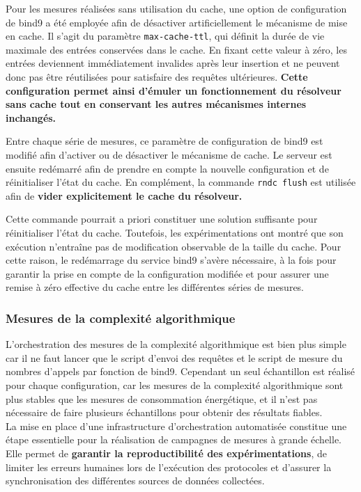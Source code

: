 \documentclass[12pt, a4paper]{report}
\begin{document}
	Pour les mesures réalisées sans utilisation du cache, une option de configuration de \gls{bind9} a été employée afin de désactiver artificiellement le mécanisme de mise en cache. Il s'agit du paramètre \texttt{max-cache-ttl}, qui définit la durée de vie maximale des entrées conservées dans le cache. En fixant cette valeur à zéro, les entrées deviennent immédiatement invalides après leur insertion et ne peuvent donc pas être réutilisées pour satisfaire des requêtes ultérieures. \textbf{Cette configuration permet ainsi d'émuler un fonctionnement du résolveur sans cache tout en conservant les autres mécanismes internes inchangés.}

	Entre chaque série de mesures, ce paramètre de configuration de \gls{bind9} est modifié afin d'activer ou de désactiver le mécanisme de cache. Le serveur est ensuite redémarré afin de prendre en compte la nouvelle configuration et de réinitialiser l'état du cache. En complément, la commande \texttt{rndc flush} est utilisée afin de \textbf{vider explicitement le cache du résolveur.}

	Cette commande pourrait a priori constituer une solution suffisante pour réinitialiser l'état du cache. Toutefois, les expérimentations ont montré que son exécution n'entraîne pas de modification observable de la taille du cache. Pour cette raison, le redémarrage du service \gls{bind9} s'avère nécessaire, à la fois pour garantir la prise en compte de la configuration modifiée et pour assurer une remise à zéro effective du cache entre les différentes séries de mesures.

	\subsubsection{Mesures de la complexité algorithmique}
		
	L'orchestration des mesures de la complexité algorithmique est bien plus simple car il ne faut lancer que le script d'envoi des requêtes et le script de mesure du nombres d'appels par fonction de \gls{bind9}. Cependant un seul échantillon est réalisé pour chaque configuration, car les mesures de la complexité algorithmique sont plus stables que les mesures de consommation énergétique, et il n'est pas nécessaire de faire plusieurs échantillons pour obtenir des résultats fiables.\\

	La mise en place d'une infrastructure d'orchestration automatisée constitue une étape essentielle pour la réalisation de campagnes de mesures à grande échelle. Elle permet de \textbf{garantir la reproductibilité des expérimentations}, de limiter les erreurs humaines lors de l'exécution des protocoles et d'assurer la synchronisation des différentes sources de données collectées.
\end{document}
